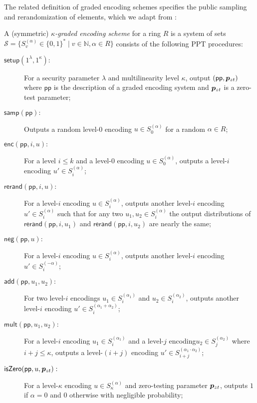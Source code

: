 The related definition of graded encoding schemes specifies the public sampling and rerandomization of elements, which we adapt from \cite{clt15}:

\begin{definition}
A (symmetric) \emph{$\kappa$-graded encoding scheme} for a ring $R$ is a system of sets $\mathcal{S} = \{S_v^{(\alpha)} \in \{0,1\}^* \mid v \in \mathbb{N}, \alpha \in R\}$ consists of the following PPT procedures:

\begin{description}
\item[$\mathsf{setup}(1^\lambda, 1^\kappa):$]  For a security parameter $\lambda$ and multilinearity level $\kappa$, output $(\mathsf{pp}, \bm{p}_{zt})$ where $\mathsf{pp}$ is the description of a graded encoding system and $\bm{p}_{zt}$ is a zero-test parameter;
\item[$\mathsf{samp}(\mathsf{pp}):$]  Outputs a random level-0 encoding $u \in S_0^{(\alpha)}$ for a random $\alpha \in R$;
\item[$\mathsf{enc}(\mathsf{pp}, i, u):$]  For a level $i \leq k$ and a level-0 encoding $u \in S_0^{(\alpha)}$, outputs a level-$i$ encoding $u' \in S_i^{(\alpha)}$;
\item[$\mathsf{rerand}(\mathsf{pp}, i, u):$]  For a level-$i$ encoding $u \in S_i^{(\alpha)}$, outputs another level-$i$ encoding $u' \in S_i^{(\alpha)}$ such that for any two $u_1, u_2 \in S_i^{(\alpha)}$ the output distributions of $\mathsf{rerand}(\mathsf{pp}, i, u_1)$ and $\mathsf{rerand}(\mathsf{pp}, i, u_2)$ are nearly the same;
\item[$\mathsf{neg}(\mathsf{pp}, u):$]  For a level-$i$ encoding $u \in S_i^{(\alpha)}$, outputs another level-$i$ encoding $u' \in S_i^{(-\alpha)}$;
\item[$\mathsf{add}(\mathsf{pp}, u_1, u_2):$]  For two level-$i$ encodings $u_1 \in S_i^{(\alpha_1)}$ and $u_2 \in S_i^{(\alpha_2)}$, outputs another level-$i$ encoding $u' \in S_i^{(\alpha_1 + \alpha_2)}$;
\item[$\mathsf{mult}(\mathsf{pp}, u_1, u_2):$]  For a level-$i$ encoding $u_1 \in S_i^{(\alpha_1)}$ and a level-$j$ encoding$u_2 \in S_j^{(\alpha_2)}$ where $i+j \leq \kappa$, outputs a level-$(i+j)$ encoding $u' \in S_{i+j}^{(\alpha_1 \cdot \alpha_2)}$;
\item[$\mathsf{isZero}(\mathsf{pp}, u, \bm{p}_{zt}):$]  For a level-$\kappa$ encoding $u \in S_\kappa^{(\alpha)}$ and zero-testing parameter $\bm{p}_{zt}$, outputs $1$ if $\alpha = 0$ and $0$ otherwise with negligible probability;

\end{description}
\end{definition}
